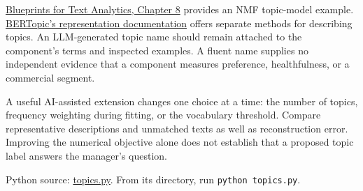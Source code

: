 \href{https://github.com/blueprints-for-text-analytics-python/blueprints-text/blob/master/ch08/Topic_Modeling_Clustering.ipynb}{Blueprints
for Text Analytics, Chapter 8} provides an NMF topic-model example.
\href{https://maartengr.github.io/BERTopic/getting_started/representation/representation.html}{BERTopic's
representation documentation} offers separate methods for describing
topics. An LLM-generated topic name should remain attached to the
component's terms and inspected examples. A fluent name supplies no
independent evidence that a component measures preference,
healthfulness, or a commercial segment.

A useful AI-assisted extension changes one choice at a time: the number
of topics, frequency weighting during fitting, or the vocabulary
threshold. Compare representative descriptions and unmatched texts as
well as reconstruction error. Improving the numerical objective alone
does not establish that a proposed topic label answers the manager's
question.

\FloatBarrier
{}
Python source:
\href{../03_Data_and_Code/mHealth/recurring_examples/topics.py}{topics.py}.
From its directory, run \texttt{python\ topics.py}.

